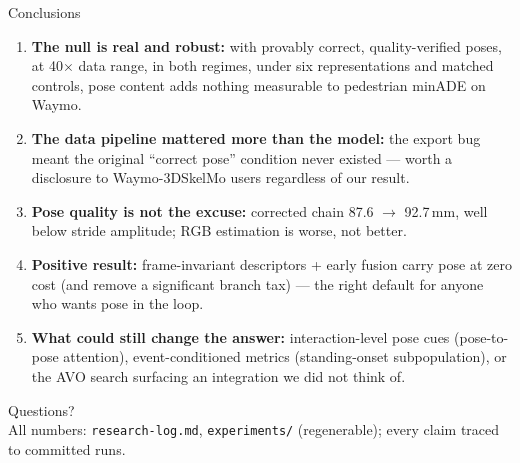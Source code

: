 \documentclass[10pt,aspectratio=169]{beamer}
\begin{document}
\begin{frame}{Conclusions}
\begin{enumerate}
  \item \textbf{The null is real and robust:} with provably correct, quality-verified poses,
        at 40$\times$ data range, in both regimes, under six representations and matched
        controls, pose content adds nothing measurable to pedestrian minADE on Waymo.
  \item \textbf{The data pipeline mattered more than the model:} the export bug meant the
        original ``correct pose'' condition never existed --- worth a disclosure to
        Waymo-3DSkelMo users regardless of our result.
  \item \textbf{Pose quality is not the excuse:} corrected chain 87.6 $\to$ 92.7\,mm,
        well below stride amplitude; RGB estimation is worse, not better.
  \item \textbf{Positive result:} frame-invariant descriptors + early fusion carry pose at
        zero cost (and remove a significant branch tax) --- the right default for anyone
        who wants pose in the loop.
  \item \textbf{What could still change the answer:} interaction-level pose cues
        (pose-to-pose attention), event-conditioned metrics (standing-onset subpopulation),
        or the AVO search surfacing an integration we did not think of.
\end{enumerate}
\end{frame}

\begin{frame}[standout]
  Questions?\\[1em]
  {\small All numbers: \texttt{research-log.md}, \texttt{experiments/} (regenerable);
  every claim traced to committed runs.}
\end{frame}
\end{document}
